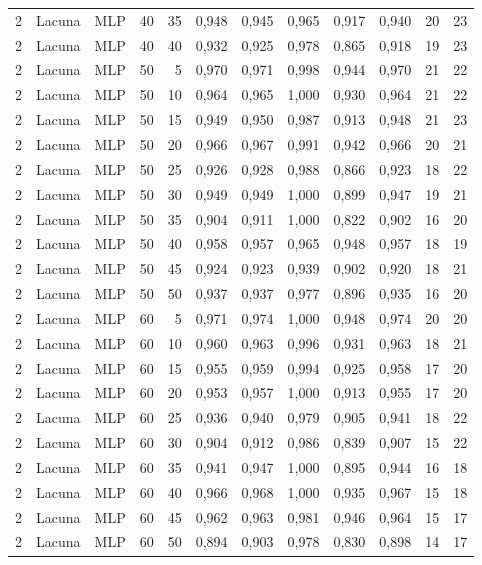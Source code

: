 \begin{longtable}{ccclrrrrrrrr}
2 & Lacuna & MLP & 40 & 35 & 0,948 & 0,945 & 0,965 & 0,917 & 0,940 & 20 & 23 \\
2 & Lacuna & MLP & 40 & 40 & 0,932 & 0,925 & 0,978 & 0,865 & 0,918 & 19 & 23 \\
2 & Lacuna & MLP & 50 & 5 & 0,970 & 0,971 & 0,998 & 0,944 & 0,970 & 21 & 22 \\
2 & Lacuna & MLP & 50 & 10 & 0,964 & 0,965 & 1,000 & 0,930 & 0,964 & 21 & 22 \\
2 & Lacuna & MLP & 50 & 15 & 0,949 & 0,950 & 0,987 & 0,913 & 0,948 & 21 & 23 \\
2 & Lacuna & MLP & 50 & 20 & 0,966 & 0,967 & 0,991 & 0,942 & 0,966 & 20 & 21 \\
2 & Lacuna & MLP & 50 & 25 & 0,926 & 0,928 & 0,988 & 0,866 & 0,923 & 18 & 22 \\
2 & Lacuna & MLP & 50 & 30 & 0,949 & 0,949 & 1,000 & 0,899 & 0,947 & 19 & 21 \\
2 & Lacuna & MLP & 50 & 35 & 0,904 & 0,911 & 1,000 & 0,822 & 0,902 & 16 & 20 \\
2 & Lacuna & MLP & 50 & 40 & 0,958 & 0,957 & 0,965 & 0,948 & 0,957 & 18 & 19 \\
2 & Lacuna & MLP & 50 & 45 & 0,924 & 0,923 & 0,939 & 0,902 & 0,920 & 18 & 21 \\
2 & Lacuna & MLP & 50 & 50 & 0,937 & 0,937 & 0,977 & 0,896 & 0,935 & 16 & 20 \\
2 & Lacuna & MLP & 60 & 5 & 0,971 & 0,974 & 1,000 & 0,948 & 0,974 & 20 & 20 \\
2 & Lacuna & MLP & 60 & 10 & 0,960 & 0,963 & 0,996 & 0,931 & 0,963 & 18 & 21 \\
2 & Lacuna & MLP & 60 & 15 & 0,955 & 0,959 & 0,994 & 0,925 & 0,958 & 17 & 20 \\
2 & Lacuna & MLP & 60 & 20 & 0,953 & 0,957 & 1,000 & 0,913 & 0,955 & 17 & 20 \\
2 & Lacuna & MLP & 60 & 25 & 0,936 & 0,940 & 0,979 & 0,905 & 0,941 & 18 & 22 \\
2 & Lacuna & MLP & 60 & 30 & 0,904 & 0,912 & 0,986 & 0,839 & 0,907 & 15 & 22 \\
2 & Lacuna & MLP & 60 & 35 & 0,941 & 0,947 & 1,000 & 0,895 & 0,944 & 16 & 18 \\
2 & Lacuna & MLP & 60 & 40 & 0,966 & 0,968 & 1,000 & 0,935 & 0,967 & 15 & 18 \\
2 & Lacuna & MLP & 60 & 45 & 0,962 & 0,963 & 0,981 & 0,946 & 0,964 & 15 & 17 \\
2 & Lacuna & MLP & 60 & 50 & 0,894 & 0,903 & 0,978 & 0,830 & 0,898 & 14 & 17 \\

\end{longtable}
